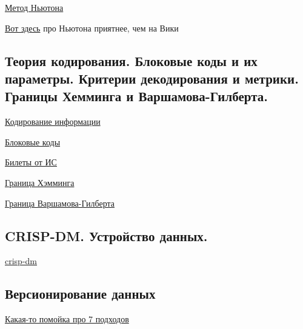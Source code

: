\documentclass{article}
\begin{document}

\href{https://ru.wikipedia.org/wiki/%D0%9C%D0%B5%D1%82%D0%BE%D0%B4_%D0%9D%D1%8C%D1%8E%D1%82%D0%BE%D0%BD%D0%B0}{Метод Ньютона}

\href{https://ru.algorithmica.org/cs/numerical/newton/}{Вот здесь} про Ньютона приятнее, чем на Вики


\subsection{Теория кодирования. Блоковые коды и их параметры. Критерии декодирования
и метрики. Границы Хемминга и Варшамова-Гилберта.}

\href{
	https://neerc.ifmo.ru/wiki/index.php?title=%
}{Кодирование информации}

\href{
	https://ru.wikipedia.org/wiki/%
}{Блоковые коды}

\href{https://docs.google.com/document/d/1Q9Q3T_WhroC04ByS0BtFDbvEZ6DrQbuFPd7fAl2XSWM/edit#heading=h.y6j1v1w9p3kd}{Билеты от ИС}

\href{
	https://ru.wikipedia.org/wiki/%
}{Граница Хэмминга}

\href{
	https://ru.wikipedia.org/wiki/%
}{Граница Варшамова-Гилберта}


\subsection{CRISP-DM. Устройство данных.}

\href{
	https://ru.wikipedia.org/wiki/CRISP-DM
}{crisp-dm}

\subsection{Версионирование данных}

\href{
	https://drive.google.com/file/d/1stLNbKM8nhGtKo_hY_c91DIdlU1SRfFs/view
}{Какая-то помойка про 7 подходов}
\end{document}
